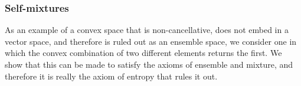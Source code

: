 
\subsubsection{Self-mixtures}

As an example of a convex space that is non-cancellative, does not embed in a vector space, and therefore is ruled out as an ensemble space, we consider one in which the convex combination of two different elements returns the first. We show that this can be made to satisfy the axioms of ensemble and mixture, and therefore it is really the axiom of entropy that rules it out.

